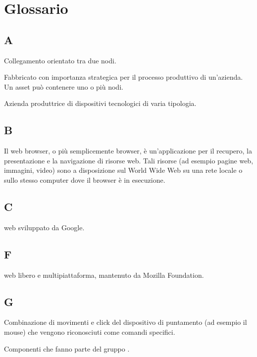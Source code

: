 \section{Glossario}
	\subsection{A}
		Collegamento orientato tra due nodi.
		
		Fabbricato con importanza strategica per il processo produttivo di un'azienda. Un asset può contenere uno o più nodi.
		
		Azienda produttrice di dispositivi tecnologici di varia tipologia.
	\subsection{B}
		Il web browser, o più semplicemente browser, è un'applicazione per il recupero, la presentazione e la navigazione di risorse web. Tali risorse (ad esempio pagine web, immagini, video) sono a disposizione sul World Wide Web su una rete locale o sullo stesso computer dove il browser è in esecuzione. 
	\subsection{C}
		 web sviluppato da Google.
	\subsection{F}
		 web  libero e multipiattaforma, mantenuto da Mozilla Foundation.
	\subsection{G}
		Combinazione di movimenti e click del dispositivo di puntamento (ad esempio il mouse) che vengono riconosciuti come comandi specifici.
		
		Componenti che fanno parte del gruppo \zephyrus.
